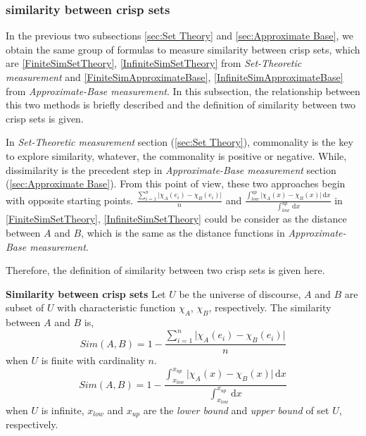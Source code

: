 \subsubsection{similarity between crisp sets}
In the previous two subsections \ref{sec:Set Theory} and \ref{sec:Approximate Base}, we obtain the same group of formulas to measure similarity between crisp sets, which are \eqref{FiniteSimSetTheory}, \eqref{InfiniteSimSetTheory} from \textit{Set-Theoretic measurement} and \eqref{FiniteSimApproximateBase}, \eqref{InfiniteSimApproximateBase} from \textit{Approximate-Base measurement}. In this subsection, the relationship between this two methods is briefly described and the definition of similarity between two crisp sets is given.

In \textit{Set-Theoretic measurement} section (\ref{sec:Set Theory}), commonality is the key to explore similarity, whatever, the commonality is positive or negative. While, dissimilarity is the precedent step in \textit{Approximate-Base measurement} section (\ref{sec:Approximate Base}). From this point of view, these two approaches begin with opposite starting points. $\frac{\sum_{i=1}^{n} \lvert \chi_{A}(e_i) - \chi_{B}(e_i) \rvert}{n}$ and $\frac{\int_{low}^{up} \lvert \chi_{A}(x) - \chi_{B}(x) \rvert\, \mathrm{d}x}{\int_{low}^{up}\, \mathrm{d}x}$ in \eqref{FiniteSimSetTheory}, \eqref{InfiniteSimSetTheory} could be consider as the distance between $A$ and $B$, which is the same as the distance functions in \textit{Approximate-Base measurement}.

Therefore, the definition of similarity between two crisp sets is given here.
\begin{defin}\textbf{Similarity between crisp sets}\label{CrispSim}
Let $U$ be the universe of discourse, $A$ and $B$ are subset of $U$ with characteristic function $\chi_{A}$, $\chi_{B}$, respectively.
The similarity between $A$ and $B$ is,
\begin{equation}\label{CSFinite}
Sim(A,B)=1- \frac{\sum_{i=1}^{n} \lvert \chi_{A}(e_i) - \chi_{B}(e_i) \rvert}{n}
\end{equation} 
when $U$ is finite with cardinality $n$.
\begin{equation}\label{CSInfinite}
Sim(A,B)=1- \frac{\int_{x_{low}}^{x_{up}}\lvert \chi_{A}(x) - \chi_{B}(x) \rvert\, \mathrm{d}x}{\int_{x_{low}}^{x_{up}}\mathrm{d}x}
\end{equation} 
when $U$ is infinite, $x_{low}$ and $x_{up}$ are the \textit{lower bound} and \textit{upper bound} of set $U$, respectively.
\end{defin}

